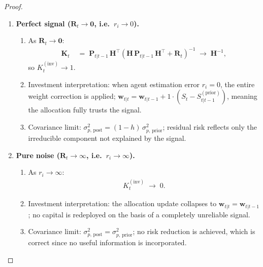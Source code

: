 \documentclass[12pt,openany]{book}
\numberwithin{equation}{chapter}
\theoremstyle{plain}
\theoremstyle{definition}
\theoremstyle{remark}
\begin{document}
\begin{proof}
\begin{enumerate}
  \item \textbf{Perfect signal ($\mathbf{R}_t \to \mathbf{0}$,
        i.e.\ $r_i \to 0$).}
        \begin{enumerate}
          \item As $\mathbf{R}_t \to \mathbf{0}$:
                \begin{align}
                  \mathbf{K}_t
                  &\;=\;
                  \mathbf{P}_{t|t-1}\,\mathbf{H}^\top
                  \!\left(\mathbf{H}\,\mathbf{P}_{t|t-1}
                  \,\mathbf{H}^\top
                  + \mathbf{R}_t\right)^{-1}
                  \;\longrightarrow\;
                  \mathbf{H}^{-1},
                \end{align}
                so $K_t^{(\mathrm{inv})} \to 1$.
          \item Investment interpretation: when agent estimation
                error $r_i = 0$, the entire weight correction is
                applied; $\mathbf{w}_{t|t} = \mathbf{w}_{t|t-1}
                + 1 \cdot (S_t - S_{t|t-1}^{(\mathrm{prior})})$,
                meaning the allocation fully trusts the signal.
          \item Covariance limit:
                $\sigma_{p,\,\text{post}}^2 = (1-h)\,
                \sigma_{p,\,\text{prior}}^2$; residual risk
                reflects only the irreducible component not
                explained by the signal.
        \end{enumerate}
  \item \textbf{Pure noise ($\mathbf{R}_t \to \infty$,
        i.e.\ $r_i \to \infty$).}
        \begin{enumerate}
          \item As $r_i \to \infty$:
                \begin{align}
                  K_t^{(\mathrm{inv})}
                  \;\longrightarrow\; 0.
                \end{align}
          \item Investment interpretation: the allocation update
                collapses to $\mathbf{w}_{t|t} =
                \mathbf{w}_{t|t-1}$; no capital is redeployed
                on the basis of a completely unreliable signal.
          \item Covariance limit:
                $\sigma_{p,\,\text{post}}^2 =
                \sigma_{p,\,\text{prior}}^2$; no risk reduction
                is achieved, which is correct since no useful
                information is incorporated.

\end{enumerate}
\end{enumerate}
\end{proof}
\end{document}
